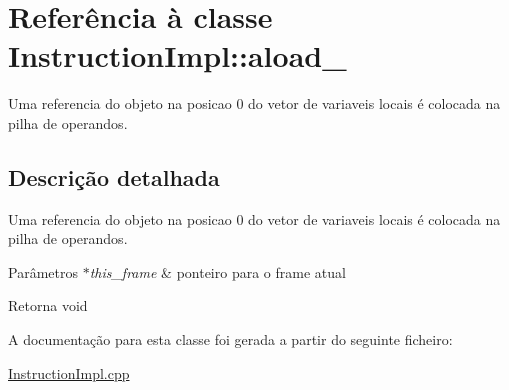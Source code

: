 \hypertarget{class_instruction_impl_1_1aload__0}{}\section{Referência à classe Instruction\+Impl\+:\+:aload\+\_}
\label{class_instruction_impl_1_1aload__0}


Uma referencia do objeto na posicao 0 do vetor de variaveis locais é colocada na pilha de operandos.  




\subsection{Descrição detalhada}
Uma referencia do objeto na posicao 0 do vetor de variaveis locais é colocada na pilha de operandos. 


\begin{DoxyParams}{Parâmetros}
{\em $\ast$this\+\_\+frame} & ponteiro para o frame atual \\
\hline
\end{DoxyParams}
\begin{DoxyReturn}{Retorna}
void 
\end{DoxyReturn}


A documentação para esta classe foi gerada a partir do seguinte ficheiro\+:\begin{DoxyCompactItemize}
\item 
\hyperlink{_instruction_impl_8cpp}{Instruction\+Impl.\+cpp}\end{DoxyCompactItemize}
